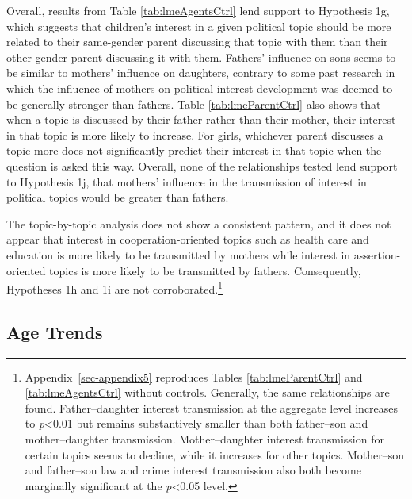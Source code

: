 \documentclass[
  letterpaper,
  DIV=11,
  numbers=noendperiod]{scrreprt}
\begin{document}
Overall, results from Table \ref{tab:lmeAgentsCtrl} lend support to
Hypothesis 1g, which suggests that children's interest in a given
political topic should be more related to their same-gender parent
discussing that topic with them than their other-gender parent
discussing it with them. Fathers' influence on sons seems to be similar
to mothers' influence on daughters, contrary to some past research in
which the influence of mothers on political interest development was
deemed to be generally stronger than fathers. Table
\ref{tab:lmeParentCtrl} also shows that when a topic is discussed by
their father rather than their mother, their interest in that topic is
more likely to increase. For girls, whichever parent discusses a topic
more does not significantly predict their interest in that topic when
the question is asked this way. Overall, none of the relationships
tested lend support to Hypothesis 1j, that mothers' influence in the
transmission of interest in political topics would be greater than
fathers.

The topic-by-topic analysis does not show a consistent pattern, and it
does not appear that interest in cooperation-oriented topics such as
health care and education is more likely to be transmitted by mothers
while interest in assertion-oriented topics is more likely to be
transmitted by fathers. Consequently, Hypotheses 1h and 1i are not
corroborated.\footnote{Appendix~\ref{sec-appendix5} reproduces Tables
  \ref{tab:lmeParentCtrl} and \ref{tab:lmeAgentsCtrl} without controls.
  Generally, the same relationships are found. Father--daughter interest
  transmission at the aggregate level increases to \emph{p}\textless0.01
  but remains substantively smaller than both father--son and
  mother--daughter transmission. Mother--daughter interest transmission
  for certain topics seems to decline, while it increases for other
  topics. Mother--son and father--son law and crime interest
  transmission also both become marginally significant at the
  \emph{p}\textless0.05 level.}

\hypertarget{age-trends}{%
\subsection{Age Trends}\label{age-trends}}
\end{document}
